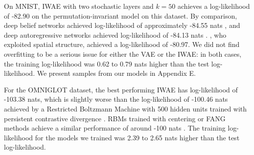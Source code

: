 \documentclass{article} %
\newcommand{\numSamples}{k}
\begin{document}
On MNIST, IWAE with two stochastic layers and $\numSamples=50$ achieves a log-likelihood of -82.90 on the permutation-invariant model on this dataset. By comparison, deep belief networks achieved log-likelihood of approximately -84.55 nats \citep{dbn_chib}, and deep autoregressive networks achieved log-likelihood of -84.13 nats \citep{DARN}. \citet{draw}, who exploited spatial structure, achieved a log-likelihood of -80.97. We did not find overfitting to be a serious issue for either the VAE or the IWAE: in both cases, the training log-likelihood was 0.62 to 0.79 nats higher than the test log-likelihood. We present samples from our models in Appendix E.

For the OMNIGLOT dataset, the best performing IWAE has log-likelihood of -103.38 nats, which is slightly worse than the log-likelihood of -100.46 nats achieved by a Restricted Boltzmann Machine with 500 hidden units trained with persistent contrastive divergence \citep{raise}. RBMs trained with centering or FANG methods achieve a similar performance of around -100 nats \citep{fang}. The training log-likelihood for the models we trained was 2.39 to 2.65 nats higher than the test log-likelihood.
\end{document}
